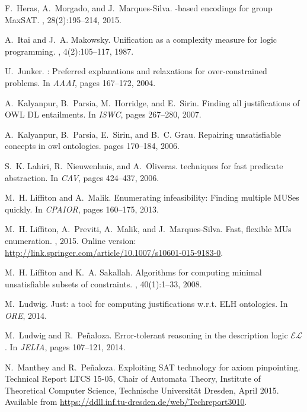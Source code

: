 \documentclass{llncs}
\begin{document}
\begin{thebibliography}{10}
F.~Heras, A.~Morgado, and J.~Marques{-}Silva.
-based encodings for group {MaxSAT}.
, 28(2):195--214, 2015.

A.~Itai and J.~A. Makowsky.
\newblock Unification as a complexity measure for logic programming.
, 4(2):105--117, 1987.

U.~Junker.
: Preferred explanations and relaxations for
  over-constrained problems.
\newblock In {\em AAAI}, pages 167--172, 2004.

A.~Kalyanpur, B.~Parsia, M.~Horridge, and E.~Sirin.
\newblock Finding all justifications of {OWL} {DL} entailments.
\newblock In {\em ISWC}, pages 267--280, 2007.

A.~Kalyanpur, B.~Parsia, E.~Sirin, and B.~C. Grau.
\newblock Repairing unsatisfiable concepts in owl ontologies.
\newblock pages 170--184, 2006.

S.~K. Lahiri, R.~Nieuwenhuis, and A.~Oliveras.
 techniques for fast predicate abstraction.
\newblock In {\em CAV}, pages 424--437, 2006.

M.~H. Liffiton and A.~Malik.
\newblock Enumerating infeasibility: Finding multiple {MUSes} quickly.
\newblock In {\em CPAIOR}, pages 160--175, 2013.

M.~H. Liffiton, A.~Previti, A.~Malik, and J.~Marques-Silva.
\newblock Fast, flexible {MU}s enumeration.
, 2015.
\newblock Online version:
  \url{http://link.springer.com/article/10.1007/s10601-015-9183-0}.

M.~H. Liffiton and K.~A. Sakallah.
\newblock Algorithms for computing minimal unsatisfiable subsets of
  constraints.
, 40(1):1--33, 2008.

M.~Ludwig.
\newblock Just: a tool for computing justifications {w.r.t.} {ELH} ontologies.
\newblock In {\em ORE}, 2014.

M.~Ludwig and R.~Pe{\~{n}}aloza.
\newblock Error-tolerant reasoning in the description logic $\mathcal{EL}$.
\newblock In {\em JELIA}, pages 107--121, 2014.

N.~Manthey and R.~Pe{\~{n}}aloza.
\newblock Exploiting {SAT} technology for axiom pinpointing.
\newblock Technical Report LTCS 15-05, Chair of Automata Theory, Institute of
  Theoretical Computer Science, Technische Universit{\"{a}}t Dresden, April
  2015.
\newblock Available from
  \url{https://ddll.inf.tu-dresden.de/web/Techreport3010}.


\end{thebibliography}
\end{document}
